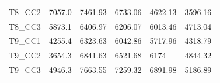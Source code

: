 \documentclass[11pt,a4paper]{article}
\begin{document}
\begin{landscape}
\begin{table}[]
\begin{tabular}{l|l|l|l|l|l}
T8\_CC2  & 7057.0               & 7461.93                                                    & 6733.06                               & 4622.13                               & 3596.16                               \\
T8\_CC3  & 5873.1               & 6406.97                                                    & 6206.07                               & 6013.46                               & 4713.04                               \\
T9\_CC1  & 4255.4               & 6323.63                                                    & 6042.86                               & 5717.96                               & 4318.79                               \\
T9\_CC2  & 3654.3               & 6841.63                                                    & 6521.68                               & 6174                                  & 4844.32                               \\
T9\_CC3  & 4946.3               & 7663.55                                                    & 7259.32                               & 6891.98                               & 5186.89                              
\end{tabular}
\end{table}
\end{landscape}
\end{document}

